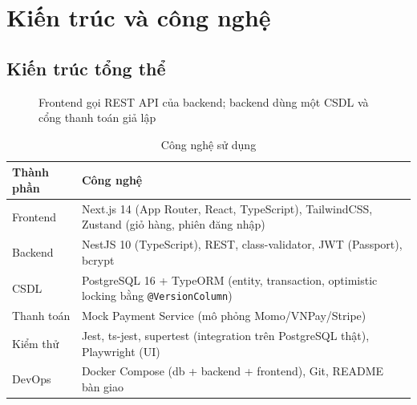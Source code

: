 \documentclass[a4paper]{article}
\begin{document}
\section{Kiến trúc và công nghệ}
\subsection{Kiến trúc tổng thể}
\begin{figure}[h!]
\centering
{}
\caption{Frontend gọi REST API của backend; backend dùng một CSDL và cổng thanh toán giả lập}\label{fig:arch}
\end{figure}

\begin{table}[h!]
\centering
\begin{tabularx}{\textwidth}{|L{3cm}|X|}
\hline
\textbf{Thành phần} & \textbf{Công nghệ} \\ \hline
Frontend & Next.js 14 (App Router, React, TypeScript), TailwindCSS, Zustand (giỏ hàng, phiên đăng nhập) \\ \hline
Backend & NestJS 10 (TypeScript), REST, class-validator, JWT (Passport), bcrypt \\ \hline
CSDL & PostgreSQL 16 + TypeORM (entity, transaction, optimistic locking bằng \texttt{@VersionColumn}) \\ \hline
Thanh toán & Mock Payment Service (mô phỏng Momo/VNPay/Stripe) \\ \hline
Kiểm thử & Jest, ts-jest, supertest (integration trên PostgreSQL thật), Playwright (UI) \\ \hline
DevOps & Docker Compose (db + backend + frontend), Git, README bàn giao \\ \hline
\end{tabularx}
\caption{Công nghệ sử dụng}
\end{table}
\end{document}
